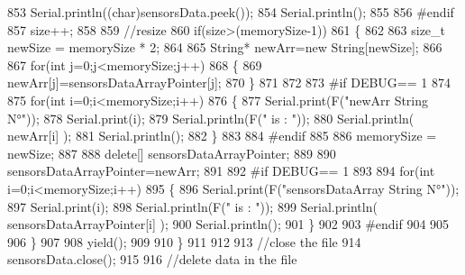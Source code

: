 \begin{DoxyCode}
853             Serial.println((\textcolor{keywordtype}{char})sensorsData.peek());
854             Serial.println();           
855             
856 \textcolor{preprocessor}{        #endif}
857             size++;
858             
859             \textcolor{comment}{//resize}
860             \textcolor{keywordflow}{if}(size>(memorySize-1))
861             \{
862                 
863                 \textcolor{keywordtype}{size\_t} newSize = memorySize * 2;
864                 
865                 String* newArr=\textcolor{keyword}{new} String[newSize];
866                 
867                 \textcolor{keywordflow}{for}(\textcolor{keywordtype}{int} j=0;j<memorySize;j++)
868                 \{
869                     newArr[j]=sensorsDataArrayPointer[j];               
870                 \}
871 
872             
873 \textcolor{preprocessor}{            #if DEBUG== 1}
874             
875                 \textcolor{keywordflow}{for}(\textcolor{keywordtype}{int} i=0;i<memorySize;i++)
876                 \{               
877                     Serial.print(F(\textcolor{stringliteral}{"newArr String N°"}));
878                     Serial.print(i);
879                     Serial.println(F(\textcolor{stringliteral}{" is : "}));
880                     Serial.println( newArr[i] );
881                     Serial.println();   
882                 \}       
883             
884 \textcolor{preprocessor}{            #endif}
885 
886                 memorySize = newSize;       
887         
888                 \textcolor{keyword}{delete}[] sensorsDataArrayPointer;
889                 
890                 sensorsDataArrayPointer=newArr;         
891                 
892 \textcolor{preprocessor}{            #if DEBUG== 1}
893         
894                 \textcolor{keywordflow}{for}(\textcolor{keywordtype}{int} i=0;i<memorySize;i++)
895                 \{               
896                     Serial.print(F(\textcolor{stringliteral}{"sensorsDataArray String N°"}));
897                     Serial.print(i);
898                     Serial.println(F(\textcolor{stringliteral}{" is : "}));
899                     Serial.println( sensorsDataArrayPointer[i] );
900                     Serial.println();   
901                 \}       
902             
903 \textcolor{preprocessor}{            #endif}
904 
905             
906             \}
907             
908             yield();
909 
910         \}
911         
912                     
913         \textcolor{comment}{//close the file}
914         sensorsData.close();
915 
916         \textcolor{comment}{//delete data in the file}

\end{DoxyCode}
